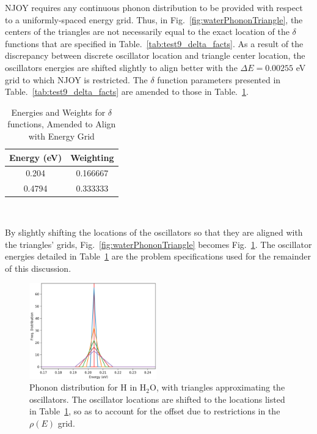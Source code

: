 \documentclass[Master.tex]{subfiles}
\begin{document}
    NJOY requires any continuous phonon distribution to be provided with respect to a uniformly-spaced energy grid. Thus, in Fig.~\ref{fig:waterPhononTriangle}, the centers of the triangles are not necessarily equal to the exact location of the $\delta$ functions that are specified in Table.~\ref{tab:test9_delta_facts}. 
    As a result of the discrepancy between discrete oscillator location and triangle center location, the oscillators energies are shifted slightly to align better with the $\Delta E=0.00255$ eV grid to which NJOY is restricted. The $\delta$ function parameters presented in Table.~\ref{tab:test9_delta_facts} are amended to those in Table.~\ref{tab:amended_delta_facts}.
    \begin{table}[h]
      \centering
      \caption[Energies and Weights for $\delta$ functions, Amended to Align with Energy Grid]{Energies and Weights for $\delta$ functions, Amended to Align with Energy Grid}
      \label{tab:amended_delta_facts}
      \begin{tabular}{ |c|c| }\hline
        Energy (eV)& Weighting\\\hline
        0.204& 0.166667\\\hline
        0.4794 & 0.333333 \\\hline
      \end{tabular}\\[1ex]
    \end{table}
    By slightly shifting the locations of the oscillators so that they are aligned with the triangles' grids, Fig.~\ref{fig:waterPhononTriangle} becomes Fig.~\ref{fig:waterPhononTriangleZoomedShifted}. The oscillator energies detailed in Table~\ref{tab:amended_delta_facts} are the problem specifications used for the remainder of this discussion. 

    \begin{figure}[H]
      \begin{center}
        \includegraphics[width=0.49\textwidth]{alteredDeltaZoomedb}
        \caption[Triangles of various widths, plotted alongside shifted $\delta$ functions]{Phonon distribution for H in H$_2$O, with triangles approximating the oscillators. The oscillator locations are shifted to the locations listed in Table~\ref{tab:amended_delta_facts}, so as to account for the offset due to restrictions in the $\rho(E)$ grid.}
        \label{fig:waterPhononTriangleZoomedShifted}
      \end{center}
    \end{figure}
\end{document}
